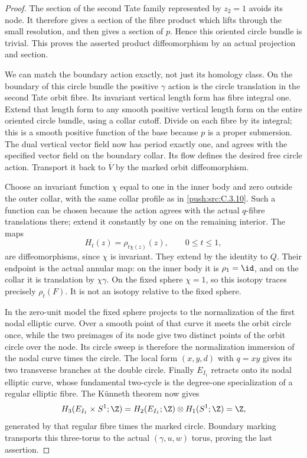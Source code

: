 \begin{proof}
The section of the second Tate family represented by $z_2=1$
avoids its node. It therefore gives a section of the fibre
product which lifts through the small resolution, and then
gives a section of $p$. Hence this oriented circle bundle is
trivial. This proves the asserted product diffeomorphism by
an actual projection and section.

We can match the boundary action exactly, not just its homology
class. On the boundary of this circle bundle the positive
$\gamma$ action is the circle translation in the second Tate
orbit fibre. Its invariant vertical length form has fibre
integral one. Extend that length form to any smooth positive
vertical length form on the entire oriented circle bundle,
using a collar cutoff. Divide on each fibre by its integral;
this is a smooth positive function of the base because $p$
is a proper submersion. The dual vertical vector field now has
period exactly one, and agrees with the specified vector field
on the boundary collar. Its flow defines the desired free
circle action. Transport it back to $\overline V$ by the marked
orbit diffeomorphism.

Choose an invariant function $\chi$ equal to one in the inner
body and zero outside the outer collar, with the same collar
profile as in \ref{push:src:C.3.10}. Such a function can be chosen because
the action agrees with the actual $q$-fibre translations there;
extend it constantly by one on the remaining interior. The
maps
\[
 H_t(z)=\rho_{t\chi(z)}(z),\qquad 0\leq t\leq1,
\]
are diffeomorphisms, since $\chi$ is invariant. They extend
by the identity to $Q$. Their endpoint is the actual annular
map: on the inner body it is $\rho_1=\id$, and on the collar
it is translation by $\chi\gamma$. On the fixed sphere
$\chi=1$, so this isotopy traces precisely $\rho_t(F)$.
It is not an isotopy relative to the fixed sphere.

In the zero-unit model the fixed sphere projects to the
normalization of the first nodal elliptic curve. Over a smooth
point of that curve it meets the orbit circle once, while the
two preimages of its node give two distinct points of the
orbit circle over the node. Its circle sweep is therefore the
normalization immersion of the nodal curve times the circle.
The local form $(x,y,d)$ with $q=xy$ gives its two transverse
branches at the double circle. Finally $E_{I_1}$ retracts onto
its nodal elliptic curve, whose fundamental two-cycle is the
degree-one specialization of a regular elliptic fibre. The
K\"unneth theorem now gives
\[
 H_3(E_{I_1}\times S^1;\Z)
 =H_2(E_{I_1};\Z)\otimes H_1(S^1;\Z)=\Z,
\]
generated by that regular fibre times the marked circle.
Boundary marking transports this three-torus to the actual
$(\gamma,u,w)$ torus, proving the last assertion.
\end{proof}

